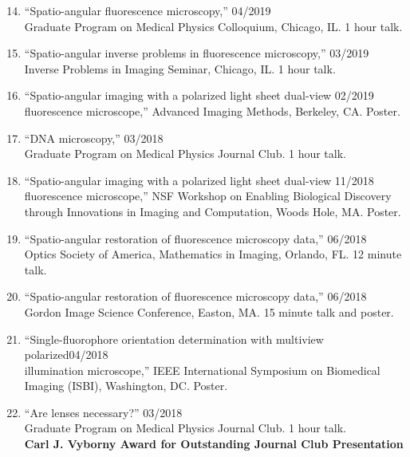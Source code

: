 \documentclass[12pt,letterpaper]{article}
\newenvironment{benumerate}[1]{
    \let\oldItem\item
    \def\item{\addtocounter{enumi}{-2}\oldItem}
    \begin{enumerate}[labelsep=0.0125\textwidth, align=left]
    \setcounter{enumi}{#1}
    \addtocounter{enumi}{1}
}{
    \end{enumerate}
}
\begin{document}
\begin{benumerate}{13}
\item {``Spatio-angular fluorescence microscopy,'' \hfill 04/2019\\
     Graduate Program on Medical Physics Colloquium, Chicago, IL. 1 hour talk.}
  
\item {``Spatio-angular inverse problems in fluorescence microscopy,'' \hfill 03/2019\\
     Inverse Problems in Imaging Seminar, Chicago, IL. 1 hour talk.}
  
\item {``Spatio-angular imaging with a polarized light sheet dual-view  \hfill 02/2019\\
    fluorescence microscope,'' Advanced Imaging Methods, Berkeley, CA. Poster.}

\item {``DNA microscopy,'' \hfill 03/2018\\
    Graduate Program on Medical Physics Journal Club. 1 hour talk.}
  
\item {``Spatio-angular imaging with a polarized light sheet dual-view  \hfill 11/2018\\
    fluorescence microscope,'' NSF Workshop on Enabling Biological Discovery\\ through
    Innovations in Imaging and Computation, Woods Hole, MA. Poster.}
  
\item {``Spatio-angular restoration of fluorescence microscopy data,'' \hfill 06/2018\\
      Optics Society of America, Mathematics in Imaging, Orlando, FL. 12 minute talk.}
  
\item {``Spatio-angular restoration of fluorescence microscopy data,'' \hfill 06/2018\\
      Gordon Image Science Conference, Easton, MA. 15 minute talk and poster.}

  \item {``Single-fluorophore orientation determination with multiview polarized\hfill 04/2018\\
      illumination microscope,'' IEEE International Symposium on Biomedical\\ Imaging (ISBI), Washington, DC. Poster.}
  
\item {``Are lenses necessary?'' \hfill 03/2018\\
    Graduate Program on Medical Physics Journal Club. 1 hour talk.\\
    \textbf{Carl J. Vyborny Award for Outstanding Journal Club Presentation}  }
  

\end{benumerate}
\end{document}
